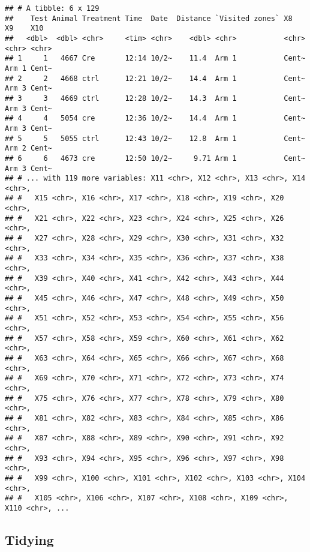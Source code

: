 \documentclass[]{article}
\begin{document}
\begin{verbatim}
## # A tibble: 6 x 129
##    Test Animal Treatment Time  Date  Distance `Visited zones` X8    X9    X10  
##   <dbl>  <dbl> <chr>     <tim> <chr>    <dbl> <chr>           <chr> <chr> <chr>
## 1     1   4667 Cre       12:14 10/2~    11.4  Arm 1           Cent~ Arm 1 Cent~
## 2     2   4668 ctrl      12:21 10/2~    14.4  Arm 1           Cent~ Arm 3 Cent~
## 3     3   4669 ctrl      12:28 10/2~    14.3  Arm 1           Cent~ Arm 3 Cent~
## 4     4   5054 cre       12:36 10/2~    14.4  Arm 1           Cent~ Arm 3 Cent~
## 5     5   5055 ctrl      12:43 10/2~    12.8  Arm 1           Cent~ Arm 2 Cent~
## 6     6   4673 cre       12:50 10/2~     9.71 Arm 1           Cent~ Arm 3 Cent~
## # ... with 119 more variables: X11 <chr>, X12 <chr>, X13 <chr>, X14 <chr>,
## #   X15 <chr>, X16 <chr>, X17 <chr>, X18 <chr>, X19 <chr>, X20 <chr>,
## #   X21 <chr>, X22 <chr>, X23 <chr>, X24 <chr>, X25 <chr>, X26 <chr>,
## #   X27 <chr>, X28 <chr>, X29 <chr>, X30 <chr>, X31 <chr>, X32 <chr>,
## #   X33 <chr>, X34 <chr>, X35 <chr>, X36 <chr>, X37 <chr>, X38 <chr>,
## #   X39 <chr>, X40 <chr>, X41 <chr>, X42 <chr>, X43 <chr>, X44 <chr>,
## #   X45 <chr>, X46 <chr>, X47 <chr>, X48 <chr>, X49 <chr>, X50 <chr>,
## #   X51 <chr>, X52 <chr>, X53 <chr>, X54 <chr>, X55 <chr>, X56 <chr>,
## #   X57 <chr>, X58 <chr>, X59 <chr>, X60 <chr>, X61 <chr>, X62 <chr>,
## #   X63 <chr>, X64 <chr>, X65 <chr>, X66 <chr>, X67 <chr>, X68 <chr>,
## #   X69 <chr>, X70 <chr>, X71 <chr>, X72 <chr>, X73 <chr>, X74 <chr>,
## #   X75 <chr>, X76 <chr>, X77 <chr>, X78 <chr>, X79 <chr>, X80 <chr>,
## #   X81 <chr>, X82 <chr>, X83 <chr>, X84 <chr>, X85 <chr>, X86 <chr>,
## #   X87 <chr>, X88 <chr>, X89 <chr>, X90 <chr>, X91 <chr>, X92 <chr>,
## #   X93 <chr>, X94 <chr>, X95 <chr>, X96 <chr>, X97 <chr>, X98 <chr>,
## #   X99 <chr>, X100 <chr>, X101 <chr>, X102 <chr>, X103 <chr>, X104 <chr>,
## #   X105 <chr>, X106 <chr>, X107 <chr>, X108 <chr>, X109 <chr>, X110 <chr>, ...
\end{verbatim}

\hypertarget{tidying}{%
\subsection{Tidying}\label{tidying}}
\end{document}
